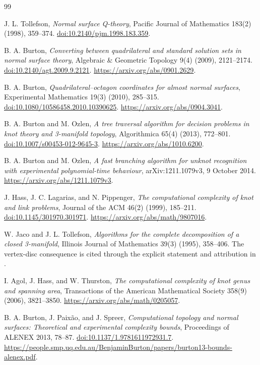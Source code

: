 \documentclass[11pt]{article}
\theoremstyle{definition}
\theoremstyle{remark}
\begin{document}
\begin{thebibliography}{99}
\raggedright

J. L. Tollefson,
\emph{Normal surface Q-theory}, Pacific Journal of Mathematics
183(2) (1998), 359--374.
\href{https://doi.org/10.2140/pjm.1998.183.359}{doi:10.2140/pjm.1998.183.359}.

B. A. Burton,
\emph{Converting between quadrilateral and standard solution sets in normal
surface theory}, Algebraic \& Geometric Topology 9(4) (2009), 2121--2174.
\href{https://doi.org/10.2140/agt.2009.9.2121}{doi:10.2140/agt.2009.9.2121}.
\url{https://arxiv.org/abs/0901.2629}.

B. A. Burton,
\emph{Quadrilateral--octagon coordinates for almost normal surfaces},
Experimental Mathematics 19(3) (2010), 285--315.
\href{https://doi.org/10.1080/10586458.2010.10390625}{doi:10.1080/10586458.2010.10390625}.
\url{https://arxiv.org/abs/0904.3041}.

B. A. Burton and M. Ozlen,
\emph{A tree traversal algorithm for decision problems in knot theory and
3-manifold topology}, Algorithmica 65(4) (2013), 772--801.
\href{https://doi.org/10.1007/s00453-012-9645-3}{doi:10.1007/s00453-012-9645-3}.
\url{https://arxiv.org/abs/1010.6200}.

B. A. Burton and M. Ozlen,
\emph{A fast branching algorithm for unknot recognition with experimental
polynomial-time behaviour}, arXiv:1211.1079v3, 9 October 2014.
\url{https://arxiv.org/abs/1211.1079v3}.

J. Hass, J. C. Lagarias, and N. Pippenger,
\emph{The computational complexity of knot and link problems},
Journal of the ACM 46(2) (1999), 185--211.
\href{https://doi.org/10.1145/301970.301971}{doi:10.1145/301970.301971}.
\url{https://arxiv.org/abs/math/9807016}.

W. Jaco and J. L. Tollefson,
\emph{Algorithms for the complete decomposition of a closed 3-manifold},
Illinois Journal of Mathematics 39(3) (1995), 358--406.
The vertex-disc consequence is cited through the explicit statement and
attribution in \cite[Theorem 5.6]{hlp}.

I. Agol, J. Hass, and W. Thurston,
\emph{The computational complexity of knot genus and spanning area},
Transactions of the American Mathematical Society 358(9) (2006), 3821--3850.
\url{https://arxiv.org/abs/math/0205057}.

B. A. Burton, J. Paix\~ao, and J. Spreer,
\emph{Computational topology and normal surfaces: Theoretical and experimental
complexity bounds}, Proceedings of ALENEX 2013, 78--87.
\href{https://doi.org/10.1137/1.9781611972931.7}{doi:10.1137/1.9781611972931.7}.
\url{https://people.smp.uq.edu.au/BenjaminBurton/papers/burton13-bounds-alenex.pdf}.


\end{thebibliography}
\end{document}
